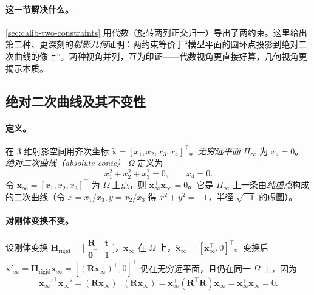 \paragraph{这一节解决什么。}
\cref{sec:calib-two-constraints} 用代数（旋转两列正交归一）导出了两约束。这里给出第二种、更深刻的\emph{射影几何}证明：两约束等价于“模型平面的圆环点投影到绝对二次曲线的像上”。两种视角并列，互为印证——代数视角更直接好算，几何视角更揭示本质。

\subsection{绝对二次曲线及其不变性}

\paragraph{定义。}
在 $3$ 维射影空间用齐次坐标 $\tilde{\mathbf{x}}=[x_1,x_2,x_3,x_4]^\top$。\emph{无穷远平面} $\Pi_\infty$ 为 $x_4=0$。\emph{绝对二次曲线（absolute conic）} $\Omega$ 定义为\cite{zhang2000calibration}
\begin{equation}
  x_1^2+x_2^2+x_3^2=0,\qquad x_4=0.
  \label{eq:calib-omega-def}
\end{equation}
令 $\mathbf{x}_\infty=[x_1,x_2,x_3]^\top$ 为 $\Omega$ 上点，则 $\mathbf{x}_\infty^\top\mathbf{x}_\infty=0$。它是 $\Pi_\infty$ 上一条由\emph{纯虚点}构成的二次曲线（令 $x=x_1/x_3,y=x_2/x_3$ 得 $x^2+y^2=-1$，半径 $\sqrt{-1}$ 的虚圆）。

\paragraph{对刚体变换不变。}
设刚体变换 $\mathbf{H}_{\mathrm{rigid}}=\big[\begin{smallmatrix}\mathbf{R}&\mathbf{t}\\\mathbf{0}^\top&1\end{smallmatrix}\big]$，$\mathbf{x}_\infty$ 在 $\Omega$ 上，$\tilde{\mathbf{x}}_\infty=[\mathbf{x}_\infty^\top,0]^\top$。变换后 $\tilde{\mathbf{x}}'_\infty=\mathbf{H}_{\mathrm{rigid}}\tilde{\mathbf{x}}_\infty=[(\mathbf{R}\mathbf{x}_\infty)^\top,0]^\top$ 仍在无穷远平面，且仍在同一 $\Omega$ 上，因为
\begin{equation}
  \mathbf{x}_\infty'^\top\mathbf{x}_\infty'=(\mathbf{R}\mathbf{x}_\infty)^\top(\mathbf{R}\mathbf{x}_\infty)=\mathbf{x}_\infty^\top(\mathbf{R}^\top\mathbf{R})\mathbf{x}_\infty=\mathbf{x}_\infty^\top\mathbf{x}_\infty=0.
\end{equation}

